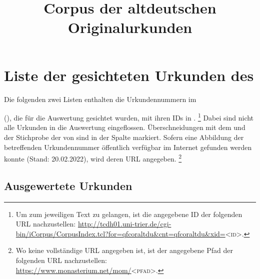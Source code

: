 \chapter{Liste der gesichteten Urkunden des }
\label{sec:urkliste}

Die folgenden zwei Listen enthalten die Urkundennummern im \title{Corpus der
altdeutschen Originalurkunden} (\CAO), die für die Auswertung gesichtet wurden,
mit ihren IDs in \citet{cao-online}.%
%
	\footnote{Um zum jeweiligen Text zu gelangen, ist die angegebene ID der
	folgenden URL nachzustellen:
	\url{http://tcdh01.uni-trier.de/cgi-bin/iCorpus/CorpusIndex.tcl?for=qfcoraltdu&cnt=qfcoraltdu&xid=}\textsc{<id>}.}
%
Dabei sind nicht alle Urkunden in die Auswertung eingeflossen. Überschneidungen
mit dem \REM{} und der Stichprobe der 
von \citet{ksw3,ksw2} sind in der Spalte  markiert. Sofern eine
Abbildung der betreffenden Urkundennummer öffentlich verfügbar im Internet
gefunden werden konnte (Stand: 20.02.2022), wird deren URL angegeben.%
%
	\footnote{Wo keine vollständige URL angegeben ist, ist der angegebene
	Pfad der folgenden URL nachzustellen:
	\url{https://www.monasterium.net/mom/}\textsc{<pfad>}.}

\section{Ausgewertete Urkunden}
\label{subsec:ausgewurk}




